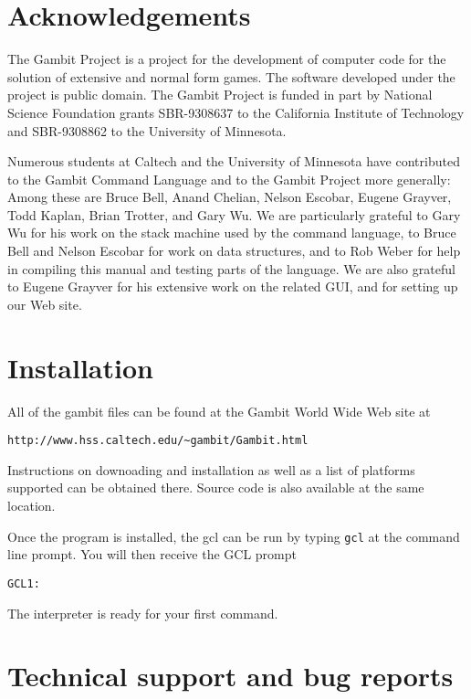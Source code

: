 \section{Acknowledgements}

The Gambit Project is a project for the development of computer code
for the solution of extensive and normal form games.  The software
developed under the project is public domain.  The Gambit Project is
funded in part by National Science Foundation grants SBR-9308637 to
the California Institute of Technology and SBR-9308862 to the
University of Minnesota.

Numerous students at Caltech and the University of Minnesota have
contributed to the Gambit Command Language and to the Gambit Project
more generally: Among these are Bruce Bell, Anand Chelian, Nelson
Escobar, Eugene Grayver, Todd Kaplan, Brian Trotter, and Gary Wu.  We
are particularly grateful to Gary Wu for his work on the stack machine
used by the command language, to Bruce Bell and Nelson Escobar for
work on data structures, and to Rob Weber for help in compiling this
manual and testing parts of the language.  We are also grateful to
Eugene Grayver for his extensive work on the related GUI, and for
setting up our Web site.

\section{Installation}

All of the gambit files can be found at the Gambit World Wide Web site
at 

\begin{verbatim}
http://www.hss.caltech.edu/~gambit/Gambit.html
\end{verbatim} 

\noindent Instructions on downoading and installation as well as a
list of platforms supported can be obtained there.  Source code is
also available at the same location. 

Once the program is installed, the gcl can be run by typing \verb+gcl+
at the command line prompt.  You will then receive the GCL prompt 

\begin{verbatim}
GCL1:
\end{verbatim}

\noindent The interpreter is ready for your first command.


\section{Technical support and bug reports}

